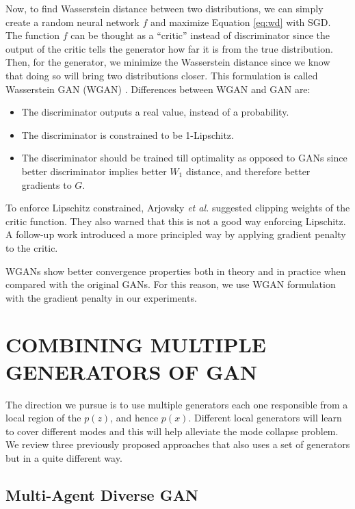 \documentclass[a4paper,onesided,12pt]{report}
\begin{document}
Now, to find Wasserstein distance between two distributions, we can simply create a random neural network $f$ and maximize Equation \ref{eq:wd} with SGD. The function $f$ can be thought as a ``critic'' instead of discriminator since the output of the critic tells the generator how far it is from the true distribution. Then, for the generator, we minimize the Wasserstein distance since we know that doing so will bring two distributions closer. This formulation is called Wasserstein GAN (WGAN) \cite{arjovsky2017wasserstein}.  Differences between WGAN and GAN are:
\begin{itemize}
	\item The discriminator outputs a real value, instead of a probability.
	\item The discriminator is constrained to be 1-Lipschitz.
	\item The discriminator should be trained till optimality as opposed to GANs since better discriminator implies better $W_1$ distance, and therefore better gradients to $G$.
\end{itemize}

To enforce Lipschitz constrained, Arjovsky \textit{et al.} \cite{arjovsky2017wasserstein} suggested clipping weights of the critic function. They also warned that this is not a good way enforcing Lipschitz. A follow-up work \cite{improved_wgan} introduced a more principled way by applying gradient penalty to the critic.

WGANs show better convergence properties both in theory and in practice when compared with the original GANs. For this reason, we use WGAN formulation with the gradient penalty \cite{improved_wgan} in our experiments.

\chapter{COMBINING MULTIPLE GENERATORS OF GAN}
\label{chapter:multiple_gan}

The direction we pursue is to use multiple generators each one responsible from a local region of the $p(z)$, and hence $p(x)$. Different local generators will learn to cover different modes and this will help alleviate the mode collapse problem. We review three previously proposed approaches that also uses a set of generators but in a quite different way.

\section{Multi-Agent Diverse GAN}
\label{sec:madgan}
\end{document}
